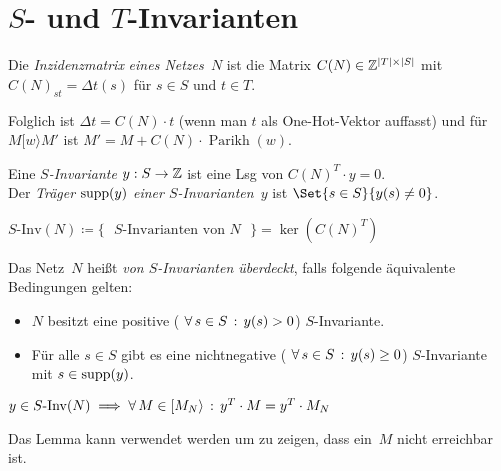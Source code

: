 \documentclass{cheat-sheet}
\newcommand{\activeTransition}[1]{[{#1}\rangle} %
\DeclareMathOperator{\Parikh}{Parikh} %
\newcommand{\SInv}{S\text{-}\mathrm{Inv}} %
\begin{document}
\section{$S$- und $T$-Invarianten}


\begin{defn}
  Die \emph{Inzidenzmatrix} \textit{eines Netzes~$N$} ist die Matrix $C(N) \in \mathbb{Z}^{\lvert T\rvert \times \lvert S\rvert}$ mit $C(N)_{s t} = \Delta t (s)$ für $s \in S$ und $t \in T$.
\end{defn}

\begin{bem}
  Folglich ist $\Delta t = C(N) \cdot t$ (wenn man $t$ als One-Hot-Vektor auffasst) und für $M \activeTransition{w} M'$ ist $M' = M + C(N) \cdot \Parikh(w)$.
\end{bem}

\begin{defn}
  Eine \emph{$S$-Invariante} $y : S \to \mathbb{Z}$ ist eine Lsg von $C(N)^T \cdot y = 0$. \\
  Der \emph{Träger} $\operatorname{supp}(y)$ \textit{einer $S$-Invarianten~$y$} ist $\Set{s \in S}{y(s) \neq 0}$. \\
\end{defn}

\begin{nota}
  $\SInv(N) \coloneqq \{ \text{ $S$-Invarianten von~$N$ } \} = \ker(C(N)^T)$
\end{nota}

\begin{lemdefn}
  Das Netz~$N$ heißt \emph{von $S$-Invarianten überdeckt}, falls folgende äquivalente Bedingungen gelten:
  \begin{itemize}
    \item $N$ besitzt eine positive (\dh{} $\forall \, {s \in S} \,:\, y(s) > 0$) $S$-Invariante.
    \item Für alle $s \in S$ gibt es eine nichtnegative (\dh{} $\forall \, {s \in S} \,:\, y(s) \geq 0$) $S$-Invariante mit $s \in \operatorname{supp}(y)$.
  \end{itemize}
\end{lemdefn}

\begin{lem}
  $y \in \SInv(N) \implies \fa{M \in \activeTransition{M_N}} y^T \cdot M = y^T \cdot M_N$
\end{lem}

\begin{bem}
  Das Lemma kann verwendet werden um zu zeigen, dass ein~$M$ nicht erreichbar ist.
\end{bem}
\end{document}
